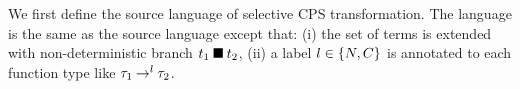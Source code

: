 
%

We first define the source language of selective CPS transformation.
The language is the same as the source language except that: (i) the set
of terms is extended with non-deterministic branch $\Br{t_1}{t_2}$, (ii)
a label $l \in \{\NC,\IC\}$ is annotated to each function type like
$\TFunL{l}{\tau_1}{\tau_2}$.

